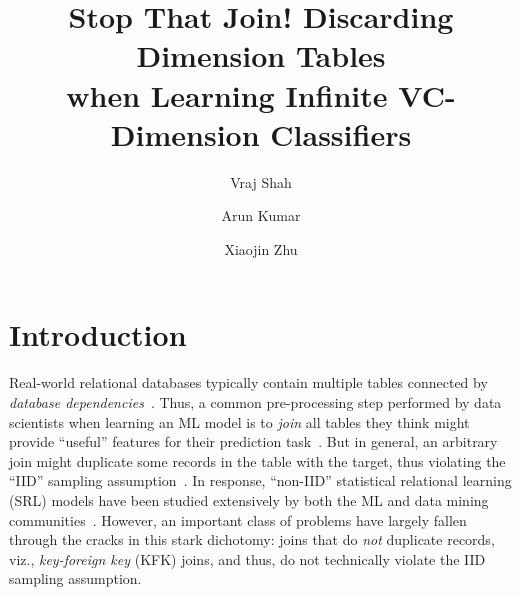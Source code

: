 \documentclass[sigconf]{acmart}
\begin{document}
\title{Stop That Join! Discarding Dimension Tables \\when Learning Infinite VC-Dimension Classifiers}

\author{Vraj Shah}
\author{Arun Kumar}
\author{Xiaojin Zhu}

\begin{abstract}

\end{abstract}


\maketitle

\section{Introduction}

Real-world relational databases typically contain multiple tables connected by \textit{database dependencies}~\cite{cowbook}. Thus, a common pre-processing step 
performed by data scientists when learning an ML model is to \textit{join} all tables they think might provide ``useful'' features for their prediction 
task~\cite{jiaweijoin,orion,libfm,hamlet,olteanuf}.
But in general, an arbitrary join might duplicate some records in the table with the target, thus violating the ``IID'' sampling assumption~\cite{hastie}. 
In response, ``non-IID'' statistical relational learning (SRL) models have been studied extensively by both the ML and data mining communities~\cite{getoor}. 
However, an important class of problems have largely fallen through the cracks in this stark dichotomy: 
joins that do \textit{not} duplicate records, viz., \textit{key-foreign key} (KFK) joins, and thus, do not technically violate the IID sampling assumption.
\end{document}
